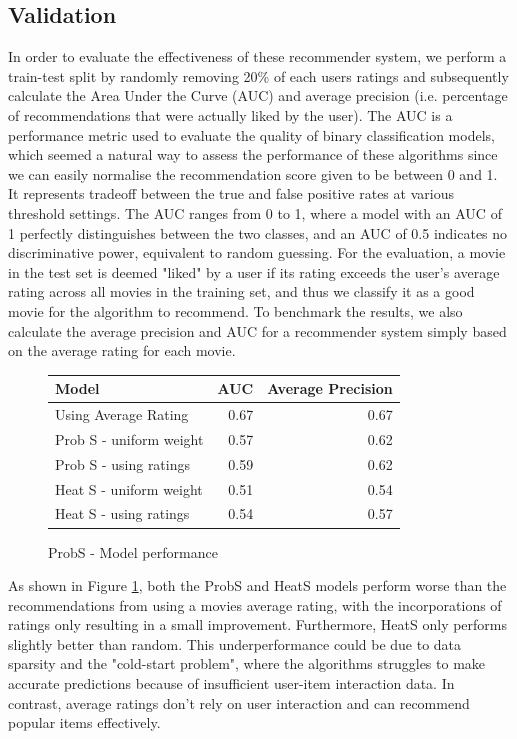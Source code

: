 \documentclass[12pt]{article}
\numberwithin{equation}{section}
\begin{document}
\subsection{Validation}

In order to evaluate the effectiveness of these recommender system, we perform a train-test split by randomly removing 20\% of each users ratings and subsequently calculate the Area Under the Curve (AUC) and average precision (i.e. percentage of recommendations that were actually liked by the user). The AUC is a performance metric used to evaluate the quality of binary classification models, which seemed a natural way to assess the performance of these algorithms since we can easily normalise the recommendation score given to be between 0 and 1. It represents tradeoff between the true and false positive rates at various threshold settings. The AUC ranges from 0 to 1, where a model with an AUC of 1 perfectly distinguishes between the two classes, and an AUC of 0.5 indicates no discriminative power, equivalent to random guessing. For the evaluation, a movie in the test set is deemed "liked" by a user if its rating exceeds the user's average rating across all movies in the training set, and thus we classify it as a good movie for the algorithm to recommend. To benchmark the results, we also calculate the average precision and AUC for a recommender system simply based on the average rating for each movie.

\begin{figure}[!ht]
    \centering  %
    \begin{tabular}{|p{6cm}|r|r|}
        \hline
        \textbf{Model} & \multicolumn{1}{p{4cm}|}{\textbf{AUC}} & \multicolumn{1}{p{4cm}|}{\textbf{Average Precision}}  \\
        \hline
        Using Average Rating & 0.67 & 0.67 \\
        Prob S - uniform weight & 0.57 & 0.62 \\
        Prob S - using ratings & 0.59 & 0.62 \\
        Heat S - uniform weight & 0.51 & 0.54 \\
        Heat S - using ratings & 0.54 & 0.57 \\
        \hline
    \end{tabular}
    \caption{ProbS - Model performance} %
    \label{fig:prob s performance} %
\end{figure}

As shown in Figure \ref{fig:prob s performance}, both the ProbS and HeatS models perform worse than the recommendations from using a movies average rating, with the incorporations of ratings only resulting in a small improvement. Furthermore, HeatS only performs slightly better than random. This underperformance could be due to data sparsity and the "cold-start problem", where the algorithms struggles to make accurate predictions because of insufficient user-item interaction data. In contrast, average ratings don't rely on user interaction and can recommend popular items effectively.
\end{document}
